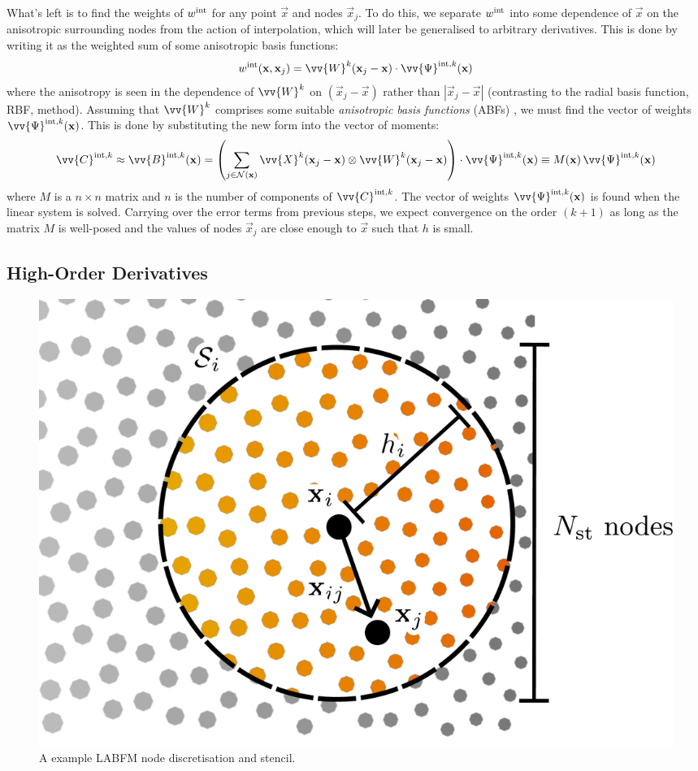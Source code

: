 What's left is to find the weights of $w^{\rm{int}}$ for any point $\vec{x}$ and nodes $\vec{x}_j$. To do this, we separate $w^{\rm{int}}$ into some dependence of $\vec{x}$ on the anisotropic surrounding nodes from the action of interpolation, which will later be generalised to arbitrary derivatives. This is done by writing it as the weighted sum of some anisotropic basis functions:
\begin{equation}
w^{\rm{int}}(\vec{x}, \vec{x}_j) = \vv{W}^k(\vec{x}_j - \vec{x}) \cdot \vv{\Psi}^{\rm{int}, k}(\vec{x})
\end{equation}
where the anisotropy is seen in the dependence of $\vv{W}^k$ on $(\vec{x}_j - \vec{x})$ rather than $|\vec{x}_j - \vec{x}|$ (contrasting to the radial basis function, RBF, method). Assuming that $\vv{W}^k$ comprises some suitable \emph{anisotropic basis functions} (ABFs) \cite{king2022HighOrderSimulationsIsothermal}, we must find the vector of weights $\vv{\Psi}^{\rm{int}, k}(\vec{x})$. This is done by substituting the new form into the vector of moments:
\begin{align}
\vv{C}^{\rm{int}, k}
\approx \vv{B}^{\rm{int}, k}(\vec{x})
= \left( \sum_{j \in \cl{N}(\vec{x})} \vv{X}^k (\vec{x}_j - \vec{x}) \otimes \vv{W}^k(\vec{x}_j - \vec{x}) \right) \cdot \vv{\Psi}^{\rm{int}, k}(\vec{x})
\equiv M(\vec{x}) \, \vv{\Psi}^{\rm{int}, k}(\vec{x})
\end{align}
where $M$ is a $n \times n$ matrix and $n$ is the number of components of $\vv{C}^{\rm{int}, k}$. The vector of weights $\vv{\Psi}^{\rm{int}, k}(\vec{x})$ is found when the linear system is solved. Carrying over the error terms from previous steps, we expect convergence on the order $(k + 1)$ as long as the matrix $M$ is well-posed and the values of nodes $\vec{x}_j$ are close enough to $\vec{x}$ such that $h$ is small.


\subsection{High-Order Derivatives}

\begin{figure}[t]
\centering
\includegraphics[scale=0.25]{assets/imgs/labfm-stencil-drawn_simple.pdf}
\caption{A example LABFM node discretisation and stencil.}
\label{fig:labfm-stencil}
\end{figure}

